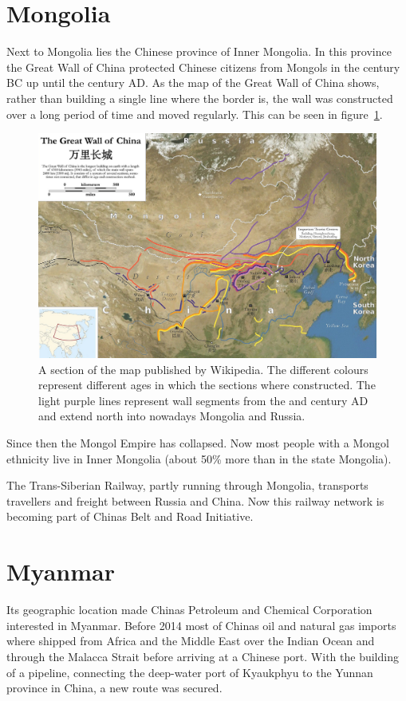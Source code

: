 \documentclass[conference]{IEEEtran}
\begin{document}
	\section{Mongolia}
	Next to Mongolia lies the Chinese province of Inner Mongolia. In this province the Great Wall of China protected Chinese citizens from Mongols in the  century BC up until the  century AD\cite{worldAtlas_whyWasTheGreatWallOfChinaBuilt}. As the map of the Great Wall of China shows, rather than building a single line where the border is, the wall was constructed over a long period of time and moved regularly. This can be seen in figure~\ref{pic:mongolia_greatWallOfChina}.
	
	\begin{figure}[t]
		\centering
		\includegraphics[width=\linewidth]{img/mongolia_greatWallOfChina.png}
		\caption{A section of the map published by Wikipedia\cite{wp_greatWallOfChina}. The different colours represent different ages in which the sections where constructed. The light purple lines represent wall segments from the  and  century AD and extend north into nowadays Mongolia and Russia.}
		\label{pic:mongolia_greatWallOfChina}
	\end{figure}

	Since then the Mongol Empire has collapsed. Now most people with a Mongol ethnicity live in Inner Mongolia (about 50\% more than in the state Mongolia).
	
	The Trans-Siberian Railway, partly running through Mongolia, transports travellers and freight between Russia and China. Now this railway network is becoming part of Chinas Belt and Road Initiative.
	
	\section{Myanmar}
	Its geographic location made Chinas Petroleum and Chemical Corporation interested in Myanmar. Before 2014 most of Chinas oil and natural gas imports where shipped from Africa and the Middle East over the Indian Ocean and through the Malacca Strait before arriving at a Chinese port. With the building of a pipeline, connecting the deep-water port of Kyaukphyu to the Yunnan province in China, a new route was secured.
	
\end{document}

